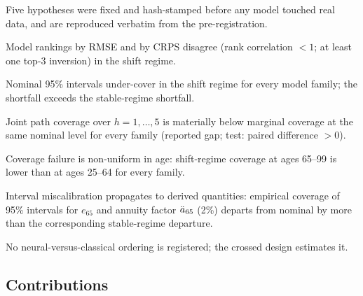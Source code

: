 Five hypotheses were fixed and hash-stamped before any model touched real
data, and are reproduced verbatim from the pre-registration.

\begin{hypothesis}[H1]
Model rankings by RMSE and by CRPS disagree (rank correlation $<1$; at least
one top-3 inversion) in the shift regime.
\end{hypothesis}
\begin{hypothesis}[H2]
Nominal 95\% intervals under-cover in the shift regime for every model
family; the shortfall exceeds the stable-regime shortfall.
\end{hypothesis}
\begin{hypothesis}[H3]
Joint path coverage over $h = 1,\dots,5$ is materially below marginal
coverage at the same nominal level for every family (reported gap; test:
paired difference $>0$).
\end{hypothesis}
\begin{hypothesis}[H4]
Coverage failure is non-uniform in age: shift-regime coverage at ages 65--99
is lower than at ages 25--64 for every family.
\end{hypothesis}
\begin{hypothesis}[H5]
Interval miscalibration propagates to derived quantities: empirical coverage
of 95\% intervals for $e_{65}$ and annuity factor $\ddot{a}_{65}$ (2\%) departs
from nominal by more than the corresponding stable-regime departure.
\end{hypothesis}

No neural-versus-classical ordering is registered; the crossed design
estimates it.

\subsection{Contributions}

